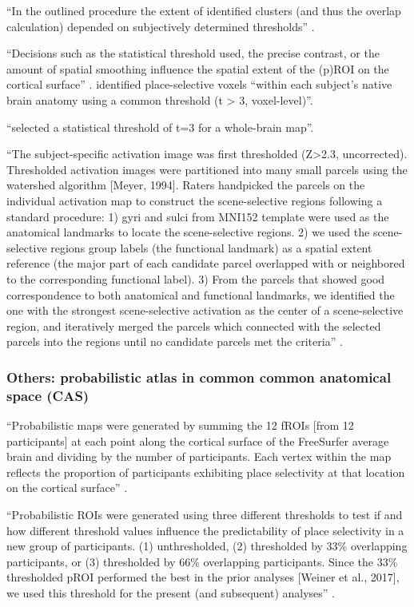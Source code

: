 %
``In the outlined procedure the extent of identified clusters (and thus the
overlap calculation) depended on subjectively determined thresholds''
\citep{frost2012measuring}.

%
``Decisions such as the statistical threshold used, the precise contrast, or the
amount of spatial smoothing influence the spatial extent of the (p)ROI on the
cortical surface'' \citep{weiner2018defining}.
%
\citet{weiner2018defining} identified place-selective voxels ``within each
subject's native brain anatomy using a common threshold (t > 3, voxel-level)''.

%
\citet{rosenke2021probabilistic} ``selected a statistical threshold of t=3 for a
whole-brain map''.


%
``The subject-specific activation image was first thresholded (Z>2.3,
uncorrected).
%
Thresholded activation images were partitioned into many small parcels using the
watershed algorithm [Meyer, 1994].
%
Raters handpicked the parcels on the individual activation map to construct the
scene-selective regions following a standard procedure:
%
1) gyri and sulci from MNI152 template were used as the anatomical landmarks to
locate the scene-selective regions.
%
2) we used the scene-selective regions group labels (the functional landmark) as
a spatial extent reference (the major part of each candidate parcel overlapped
with or neighbored to the corresponding functional label).
%
3) From the parcels that showed good correspondence to both anatomical and
functional landmarks, we identified the one with the strongest scene-selective
activation as the center of a scene-selective region, and iteratively merged the
parcels which connected with the selected parcels into the regions until no
candidate parcels met the criteria'' \citep{zhen2017quantifying}.


\subsubsection{Others: probabilistic atlas in common common anatomical space
(CAS)}

%
``Probabilistic maps were generated by summing the 12 fROIs [from 12
participants] at each point along the cortical surface of the FreeSurfer average
brain and dividing by the number of participants.
%
Each vertex within the map reflects the proportion of participants exhibiting
place selectivity at that location on the cortical surface''
\citep{weiner2018defining}.

%
``Probabilistic ROIs were generated using three different thresholds to test if
and how different threshold values influence the predictability of place
selectivity in a new group of participants.
%
(1) unthresholded,
%
(2) thresholded by 33\% overlapping participants, or
%
(3) thresholded by 66\% overlapping participants.
%
Since the 33\% thresholded pROI performed the best in the prior analyses [Weiner
et al., 2017], we used this threshold for the present (and subsequent)
analyses'' \citep{weiner2018defining}.

